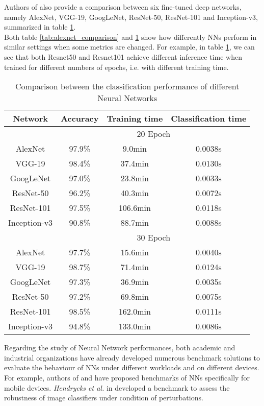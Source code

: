 Authors of \cite{suh_transfer_2018} also provide a comparison between six fine-tuned deep networks, namely AlexNet, VGG-19, GoogLeNet, ResNet-50, ResNet-101 and Inception-v3, summarized in table \ref{tab:models_ex_comp}.\\
Both table \ref{tab:alexnet_comparison} and \ref{tab:models_ex_comp} show how differently NNs perform in similar settings when some metrics are changed. For example, in table \ref{tab:models_ex_comp}, we can see that both Resnet50 and Resnet101 achieve different inference time when trained for different numbers of epochs, i.e. with different training time.\\
\begin{table}[h]
\centering
\begin{tabular}{|c| ccc|}
  \hline
 Network &Accuracy& Training time   &Classification time   \\
 \hline
 &\multicolumn{3}{c|}{20 Epoch}\\
 \hline
AlexNet &97.9\%& 9.0min   &0.0038s    \\
VGG-19 &98.4\%& 37.4min   &0.0130s  \\
GoogLeNet &97.0\%& 23.8min  &0.0033s \\
ResNet-50 &96.2\%& 40.3min  &0.0072s\\
ResNet-101 &97.5\%& 106.6min   &0.0118s \\
Inception-v3 &90.8\%& 88.7min &0.0088s \\
\hline
&\multicolumn{3}{c|}{30 Epoch}\\
\hline
AlexNet & 97.7\% &15.6min &0.0040s     \\
VGG-19 &98.7\% &71.4min&0.0124s  \\
GoogLeNet  &97.3\% &36.9min& 0.0035s     \\
ResNet-50 & 97.2\% &69.8min&0.0075s      \\
ResNet-101 & 98.5\% &162.0min&   0.0111s   \\
Inception-v3 & 94.8\% &133.0min   & 0.0086s  \\
\hline
\end{tabular}
\caption[Comparison between the classification performance of different Neural Networks]{Comparison between the classification performance of different Neural Networks \cite{suh_transfer_2018}}
 \label{tab:models_ex_comp}
\end{table}
Regarding the study of Neural Network performances, both academic and industrial organizations have already developed numerous benchmark solutions to evaluate the behaviour of NNs under different workloads and on different devices. For example, authors of \cite{luo2020comparison} and \cite{ignatov2019ai} have proposed benchmarks of NNs specifically for mobile devices. \textit{Hendrycks et al.} in  \cite{hendrycks2019benchmarking} developed a benchmark to assess the robustness of image classifiers under condition of perturbations. \\

